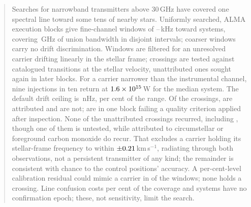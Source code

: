 \begin{abstract}
Searches for narrowband transmitters above 30\,GHz have covered one
spectral line toward some tens of nearby stars. Uniformly searched, \NEB{}
ALMA execution blocks give \NWinA{} fine-channel windows of
\ChanLoA--\ChanHiA\,kHz toward \NSysClassA{} systems, covering
\CvUnionA\,GHz of union bandwidth in \CovNIslands{} disjoint intervals;
\NWinB{} coarser windows carry no drift discrimination.
Windows are filtered for an unresolved carrier drifting linearly in the
stellar frame; crossings are tested against catalogued transitions at the
stellar velocity, unattributed ones sought again in later blocks. For a
carrier narrower than the instrumental channel, nine injections in ten return
at $\EirpNinetySysMedA$\,W for the median system. The default drift ceiling
is \DriftCeilLo\,nHz, \AccelSheikhPct{} per cent of the \citet{Sheikh2019}
range. Of the \EvNCrossRaw{} crossings, \MkAttr{} are attributed and
\MkUnattr{} are not; \PrFlagXrossWord{} are in one
block failing a quality criterion applied after inspection. None of the
unattributed crossings recurred, including \PrRankClause, though one of them
is untested, while \MkAttrRecur{} attributed to
circumstellar or foreground carbon monoxide do recur. That excludes a carrier
holding its stellar-frame
frequency to within $\pm\RqDvMed$\,km\,s$^{-1}$, radiating through both
observations, not a persistent transmitter of any kind; the remainder is
consistent with chance to the control positions' accuracy. A per-cent-level
calibration residual could mimic a carrier in \CxNAdmit{} of the windows;
none holds a crossing. Line
confusion costs \MkMaskAPct{} per cent of the coverage and \RcNoRepSys{}
systems have no confirmation epoch; these, not sensitivity, limit the search.
\end{abstract}


